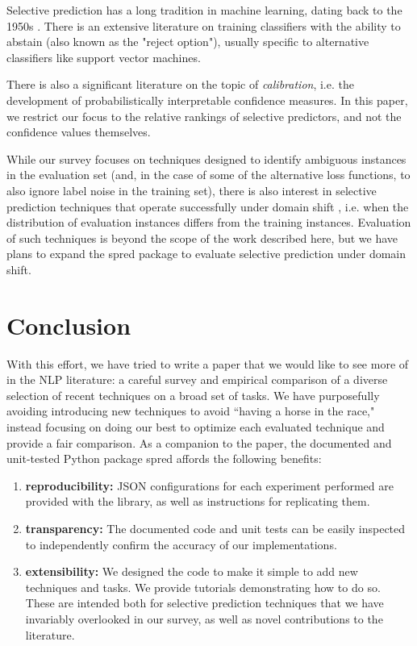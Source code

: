 \documentclass[11pt]{article}
\begin{document}
Selective prediction has a long tradition in machine learning, dating back to the  1950s \cite{chow1957optimum}. There is an extensive literature \cite{hellman1970nearest,fumera2002support,cortes2016learning} on training classifiers with the ability to abstain (also known as the "reject option"), usually specific to alternative classifiers like support vector machines.

There is also a significant literature \cite{platt1999probabilistic,guo2017calibration,kumar2018trainable,wang-etal-2020-inference,desai-durrett-2020-calibration} on the topic of \emph{calibration}, i.e. the development of probabilistically interpretable confidence measures. In this paper, we restrict our focus to the relative rankings of selective predictors, and not the confidence values themselves. 


While our survey focuses on techniques designed to identify ambiguous instances in the evaluation set (and, in the case of some of the alternative loss functions, to also ignore label noise in the training set), there is also interest in selective prediction techniques that operate successfully under domain shift \cite{kamath-etal-2020-selective}, i.e. when the distribution of evaluation instances differs from the training instances. Evaluation of such techniques is beyond the scope of the work described here, but we have plans to expand the \textsf{spred} package to evaluate selective prediction under domain shift.


\section{Conclusion}

With this effort, we have tried to write a paper that we would like to see more of in the NLP literature: a careful survey and empirical comparison of a diverse selection of recent techniques on a broad set of tasks. We have purposefully avoiding introducing new techniques to avoid ``having a horse in the race," instead focusing on doing our best to optimize each evaluated technique and provide a fair comparison. As a companion to the paper, the documented and unit-tested Python package \textsf{spred} affords the following benefits:
\begin{enumerate}
	\item \textbf{reproducibility: } JSON configurations for each experiment performed are provided with the library, as well as instructions for replicating them.
	\item \textbf{transparency: } The documented code and unit tests can be easily inspected to independently confirm the accuracy of our implementations.
	\item \textbf{extensibility: } We designed the code to make it simple to add new techniques and tasks. We provide tutorials demonstrating how to do so. These are intended both for selective prediction techniques that we have invariably overlooked in our survey, as well as novel contributions to the literature. 
	\end{enumerate}
\end{document}
